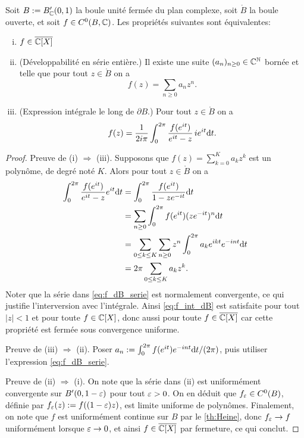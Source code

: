 \begin{proposition}
\label{prop:StoneCtrEx}
Soit $B := B'_{\mathbb{C}}(0,1)$ la boule unité fermée du plan complexe, soit $\mathring B$ la boule ouverte, et soit $f \in C^0(B, \mathbb{C})$. Les propriétés suivantes sont équivalentes:
\begin{enumerate}[(i)]
	\item $f \in \overline{\mathbb{C}[X]}$
	\item (Développabilité en série entière.) Il existe une suite $(a_n)_{n \geq 0} \in \mathbb{C}^{\mathbb{N}}$ bornée et telle que pour tout $z \in \mathring B$ on a %
	\begin{equation*}
		f(z) = \sum_{n \geq 0} a_n z^n.
	\end{equation*}
	\item (Expression intégrale le long de $\partial B$.) Pour tout $z \in \mathring B$ on a 
	\begin{equation}
	\label{eq:f_int_dB}
		f(z) = \frac{1}{2i\pi}\int_0^{2 \pi} \frac{f(e^{it})}{e^{it}-z} \, i e^{it} \mathrm{d} t.		
	\end{equation}
\end{enumerate}

\begin{proof}
	Preuve de (i) $\Rightarrow$ (iii). Supposons que $f(z) = \sum_{k=0}^K a_k z^k$ est un polynôme, de degré noté $K$. 
	Alors pour tout $z \in \mathring B$ on a 
	\begin{align}
	\nonumber
		\int_0^{2 \pi} \frac{f(e^{it})}{e^{it}-z} e^{it} \mathrm{d} t 
		&= \int_0^{2 \pi} \frac{f(e^{it})}{1-z e^{-it}} \mathrm{d} t \\
	\label{eq:f_dB_serie}
		&= \sum_{n \geq 0} \int_0^{2 \pi} f(e^{it}) (z e^{-it})^n \mathrm{d} t \\
	\nonumber
		&= \sum_{0 \leq k \leq K} \sum_{n \geq 0}  z^n \int_0^{2 \pi} a_k e^{ikt}  e^{-int} \mathrm{d} t \\
	\nonumber
		&= 2 \pi \sum_{0 \leq k \leq K} a_k z^k. 
	\end{align}
	Noter que la série dans \eqref{eq:f_dB_serie} est normalement convergente, ce qui justifie l'interversion avec l'intégrale.
	Ainsi \eqref{eq:f_int_dB} est satisfaite pour tout $|z|<1$ et pour toute $f \in \mathbb{C}[X]$, donc aussi pour toute $f \in \overline {\mathbb{C}[X]}$ car cette propriété est fermée sous convergence uniforme.
	
	Preuve de (iii) $\Rightarrow$ (ii). Poser $a_n := \int_0^{2 \pi} f(e^{it}) e^{-int} \mathrm{d} t / (2 \pi)$, puis utiliser l'expression \eqref{eq:f_dB_serie}.
	
	Preuve de (ii) $\Rightarrow$ (i). On note que la série dans (ii) est uniformément convergente sur $B'(0,1-\varepsilon)$ pour tout $\varepsilon>0$. On en déduit que $f_\varepsilon \in C^0(B)$, définie par $f_\varepsilon(z) := f( (1-\varepsilon) z)$, est limite uniforme de polynômes. 
	Finalement, on note que $f$ est uniformément continue sur $B$ par le \cref{th:Heine}, donc $f_\varepsilon \to f$ uniformément lorsque $\varepsilon\to 0$, et ainsi $f \in  \overline{\mathbb{C}[X]}$ par fermeture, ce qui conclut.
\end{proof}
	
\end{proposition}

